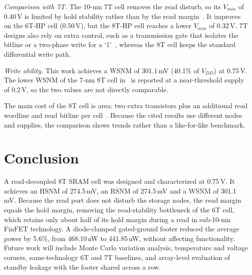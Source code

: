 \documentclass[conference]{IEEEtran}
\begin{document}
\textit{Comparison with 7T.} The 10-nm 7T cell removes the read disturb, so its $V_{min}$ of 0.40\,V is limited by hold stability rather than by the read margin~\cite{ansari2015near7t}. It improves on the 6T-HP cell (0.50\,V), but the 8T-HP cell reaches a lower $V_{min}$ of 0.32\,V. 7T designs also rely on extra control, such as a transmission gate that isolates the bitline or a two-phase write for a `1'~\cite{yang2016single7t}, whereas the 8T cell keeps the standard differential write path.

\textit{Write ability.} This work achieves a WSNM of 301.1\,mV (40.1\% of $V_{DD}$) at 0.75\,V. The lower WSNM of the 7-nm 8T cell in~\cite{abbasian2022comp} is reported at a near-threshold supply of 0.2\,V, so the two values are not directly comparable.

The main cost of the 8T cell is area: two extra transistors plus an additional read wordline and read bitline per cell~\cite{chang2005stable}. Because the cited results use different nodes and supplies, the comparison shows trends rather than a like-for-like benchmark.

\section{Conclusion}
A read-decoupled 8T SRAM cell was designed and characterized at 0.75\,V. It achieves an HSNM of 274.5\,mV, an RSNM of 274.5\,mV and a WSNM of 301.1\,mV. Because the read port does not disturb the storage nodes, the read margin equals the hold margin, removing the read-stability bottleneck of the 6T cell, which retains only about half of its hold margin during a read in sub-10-nm FinFET technology. A diode-clamped gated-ground footer reduced the average power by 5.6\%, from 468.10\,nW to 441.85\,nW, without affecting functionality. Future work will include Monte Carlo variation analysis, temperature and voltage corners, same-technology 6T and 7T baselines, and array-level evaluation of standby leakage with the footer shared across a row.
\end{document}
